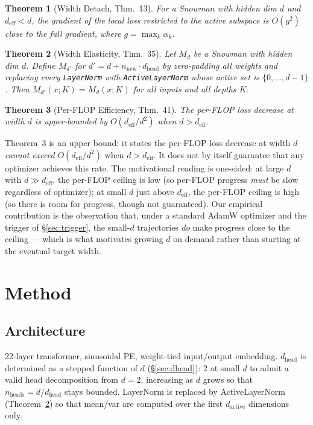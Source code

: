 \documentclass{article}
\newtheorem{theorem}{Theorem}
\newcommand{\deff}{d_{\mathrm{eff}}}
\begin{document}
\begin{theorem}[Width Detach, \citealt{paving} Thm.~13]
For a Snowman with hidden dim $d$ and $\deff < d$, the gradient of the local
loss restricted to the active subspace is $O(g^2)$ close to the full
gradient, where $g = \max_k \alpha_k$.
\end{theorem}

\begin{theorem}[Width Elasticity, \citealt{paving} Thm.~35]
\label{thm:elasticity}
Let $M_d$ be a Snowman with hidden dim $d$.  Define $M_{d'}$ for
$d' = d + n_{\text{new}} \cdot d_{\text{head}}$ by zero-padding all weights
and replacing every \texttt{LayerNorm} with \texttt{ActiveLayerNorm} whose
active set is $\{0, \ldots, d-1\}$.  Then $M_{d'}(x; K) = M_d(x; K)$ for all
inputs and all depths $K$.
\end{theorem}

\begin{theorem}[Per-FLOP Efficiency, \citealt{paving} Thm.~41]
The per-FLOP loss decrease at width $d$ is upper-bounded by
$O(\deff / d^2)$ when $d > \deff$.
\end{theorem}

Theorem~3 is an upper bound: it states the per-FLOP loss decrease at
width $d$ \emph{cannot exceed} $O(\deff / d^2)$ when $d > \deff$.  It
does not by itself guarantee that any optimizer achieves this rate.
The motivational reading is one-sided: at large $d$ with $d \gg
\deff$, the per-FLOP ceiling is low (so per-FLOP progress \emph{must}
be slow regardless of optimizer); at small $d$ just above $\deff$,
the per-FLOP ceiling is high (so there is room for progress, though
not guaranteed).  Our empirical contribution is the observation that,
under a standard AdamW optimizer and the trigger of \S\ref{sec:trigger},
the small-$d$ trajectories \emph{do} make progress close to the
ceiling --- which is what motivates growing $d$ on demand rather than
starting at the eventual target width.

\section{Method}
\label{sec:method}

\subsection{Architecture}
22-layer transformer, sinusoidal PE, weight-tied input/output
embedding.  $d_{\text{head}}$ is determined as a stepped function of
$d$ (\S\ref{sec:dhead}): $2$ at small $d$ to admit a valid head
decomposition from $d{=}2$, increasing as $d$ grows so that
$n_{\text{heads}} = d/d_{\text{head}}$ stays bounded.  LayerNorm is
replaced by ActiveLayerNorm (Theorem~\ref{thm:elasticity}) so that
mean/var are computed over the first $d_{\text{active}}$ dimensions
only.
\end{document}
